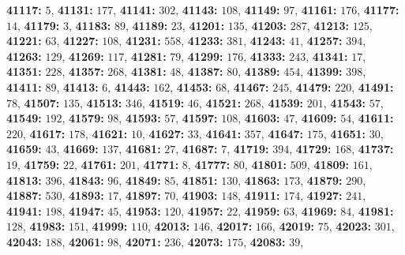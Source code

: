 \textsf{\bfseries 41117:} $5$, \textsf{\bfseries 41131:} $177$, \textsf{\bfseries 41141:} $302$, \textsf{\bfseries 41143:} $108$, \textsf{\bfseries 41149:} $97$, \textsf{\bfseries 41161:} $176$, \textsf{\bfseries 41177:} $14$, \textsf{\bfseries 41179:} $3$, \textsf{\bfseries 41183:} $89$, \textsf{\bfseries 41189:} $23$, \textsf{\bfseries 41201:} $135$, \textsf{\bfseries 41203:} $287$, \textsf{\bfseries 41213:} $125$, \textsf{\bfseries 41221:} $63$, \textsf{\bfseries 41227:} $108$, \textsf{\bfseries 41231:} $558$, \textsf{\bfseries 41233:} $381$, \textsf{\bfseries 41243:} $41$, \textsf{\bfseries 41257:} $394$, \textsf{\bfseries 41263:} $129$, \textsf{\bfseries 41269:} $117$, \textsf{\bfseries 41281:} $79$, \textsf{\bfseries 41299:} $176$, \textsf{\bfseries 41333:} $243$, \textsf{\bfseries 41341:} $17$, \textsf{\bfseries 41351:} $228$, \textsf{\bfseries 41357:} $268$, \textsf{\bfseries 41381:} $48$, \textsf{\bfseries 41387:} $80$, \textsf{\bfseries 41389:} $454$, \textsf{\bfseries 41399:} $398$, \textsf{\bfseries 41411:} $89$, \textsf{\bfseries 41413:} $6$, \textsf{\bfseries 41443:} $162$, \textsf{\bfseries 41453:} $68$, \textsf{\bfseries 41467:} $245$, \textsf{\bfseries 41479:} $220$, \textsf{\bfseries 41491:} $78$, \textsf{\bfseries 41507:} $135$, \textsf{\bfseries 41513:} $346$, \textsf{\bfseries 41519:} $46$, \textsf{\bfseries 41521:} $268$, \textsf{\bfseries 41539:} $201$, \textsf{\bfseries 41543:} $57$, \textsf{\bfseries 41549:} $192$, \textsf{\bfseries 41579:} $98$, \textsf{\bfseries 41593:} $57$, \textsf{\bfseries 41597:} $108$, \textsf{\bfseries 41603:} $47$, \textsf{\bfseries 41609:} $54$, \textsf{\bfseries 41611:} $220$, \textsf{\bfseries 41617:} $178$, \textsf{\bfseries 41621:} $10$, \textsf{\bfseries 41627:} $33$, \textsf{\bfseries 41641:} $357$, \textsf{\bfseries 41647:} $175$, \textsf{\bfseries 41651:} $30$, \textsf{\bfseries 41659:} $43$, \textsf{\bfseries 41669:} $137$, \textsf{\bfseries 41681:} $27$, \textsf{\bfseries 41687:} $7$, \textsf{\bfseries 41719:} $394$, \textsf{\bfseries 41729:} $168$, \textsf{\bfseries 41737:} $19$, \textsf{\bfseries 41759:} $22$, \textsf{\bfseries 41761:} $201$, \textsf{\bfseries 41771:} $8$, \textsf{\bfseries 41777:} $80$, \textsf{\bfseries 41801:} $509$, \textsf{\bfseries 41809:} $161$, \textsf{\bfseries 41813:} $396$, \textsf{\bfseries 41843:} $96$, \textsf{\bfseries 41849:} $85$, \textsf{\bfseries 41851:} $130$, \textsf{\bfseries 41863:} $173$, \textsf{\bfseries 41879:} $290$, \textsf{\bfseries 41887:} $530$, \textsf{\bfseries 41893:} $17$, \textsf{\bfseries 41897:} $70$, \textsf{\bfseries 41903:} $148$, \textsf{\bfseries 41911:} $174$, \textsf{\bfseries 41927:} $241$, \textsf{\bfseries 41941:} $198$, \textsf{\bfseries 41947:} $45$, \textsf{\bfseries 41953:} $120$, \textsf{\bfseries 41957:} $22$, \textsf{\bfseries 41959:} $63$, \textsf{\bfseries 41969:} $84$, \textsf{\bfseries 41981:} $128$, \textsf{\bfseries 41983:} $151$, \textsf{\bfseries 41999:} $110$, \textsf{\bfseries 42013:} $146$, \textsf{\bfseries 42017:} $166$, \textsf{\bfseries 42019:} $75$, \textsf{\bfseries 42023:} $301$, \textsf{\bfseries 42043:} $188$, \textsf{\bfseries 42061:} $98$, \textsf{\bfseries 42071:} $236$, \textsf{\bfseries 42073:} $175$, \textsf{\bfseries 42083:} $39$, 
